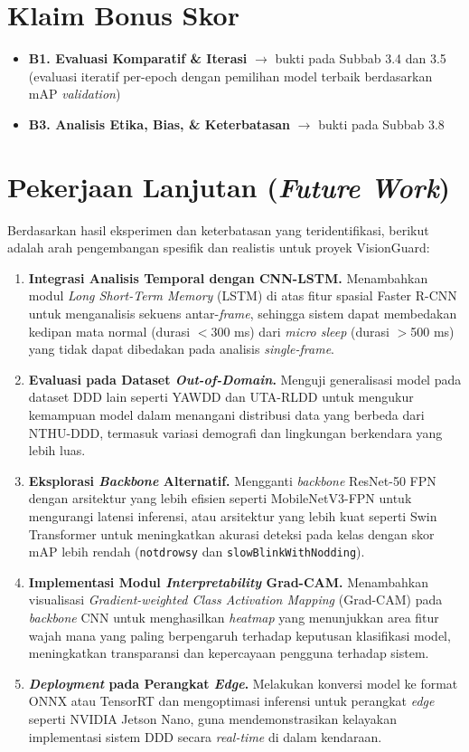 \documentclass[11pt,a4paper,oneside]{report}
\begin{document}
\section{Klaim Bonus Skor}

\begin{itemize}[leftmargin=*]
    \item[$\boxtimes$] \textbf{B1. Evaluasi Komparatif \& Iterasi} $\rightarrow$ bukti pada Subbab 3.4 dan 3.5 (evaluasi iteratif per-epoch dengan pemilihan model terbaik berdasarkan mAP \textit{validation})
    \item[$\boxtimes$] \textbf{B3. Analisis Etika, Bias, \& Keterbatasan} $\rightarrow$ bukti pada Subbab 3.8
\end{itemize}

\section{Pekerjaan Lanjutan (\textit{Future Work})}

Berdasarkan hasil eksperimen dan keterbatasan yang teridentifikasi, berikut adalah arah pengembangan spesifik dan realistis untuk proyek VisionGuard:

\begin{enumerate}[leftmargin=*]
    \item \textbf{Integrasi Analisis Temporal dengan CNN-LSTM.} Menambahkan modul \textit{Long Short-Term Memory} (LSTM) di atas fitur spasial Faster R-CNN untuk menganalisis sekuens antar-\textit{frame}, sehingga sistem dapat membedakan kedipan mata normal (durasi $<$300 ms) dari \textit{micro sleep} (durasi $>$500 ms) yang tidak dapat dibedakan pada analisis \textit{single-frame}.
    \item \textbf{Evaluasi pada Dataset \textit{Out-of-Domain}.} Menguji generalisasi model pada dataset DDD lain seperti YAWDD dan UTA-RLDD untuk mengukur kemampuan model dalam menangani distribusi data yang berbeda dari NTHU-DDD, termasuk variasi demografi dan lingkungan berkendara yang lebih luas.
    \item \textbf{Eksplorasi \textit{Backbone} Alternatif.} Mengganti \textit{backbone} ResNet-50 FPN dengan arsitektur yang lebih efisien seperti MobileNetV3-FPN untuk mengurangi latensi inferensi, atau arsitektur yang lebih kuat seperti Swin Transformer untuk meningkatkan akurasi deteksi pada kelas dengan skor mAP lebih rendah (\texttt{notdrowsy} dan \texttt{slowBlinkWithNodding}).
    \item \textbf{Implementasi Modul \textit{Interpretability} Grad-CAM.} Menambahkan visualisasi \textit{Gradient-weighted Class Activation Mapping} (Grad-CAM) pada \textit{backbone} CNN untuk menghasilkan \textit{heatmap} yang menunjukkan area fitur wajah mana yang paling berpengaruh terhadap keputusan klasifikasi model, meningkatkan transparansi dan kepercayaan pengguna terhadap sistem.
    \item \textbf{\textit{Deployment} pada Perangkat \textit{Edge}.} Melakukan konversi model ke format ONNX atau TensorRT dan mengoptimasi inferensi untuk perangkat \textit{edge} seperti NVIDIA Jetson Nano, guna mendemonstrasikan kelayakan implementasi sistem DDD secara \textit{real-time} di dalam kendaraan.
\end{enumerate}
\end{document}
